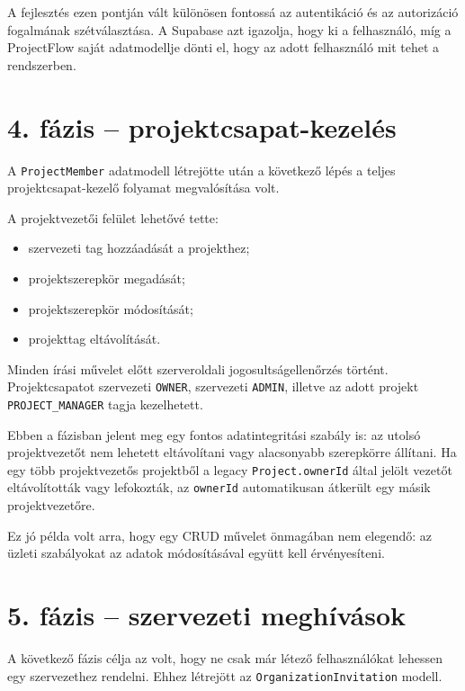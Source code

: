 \documentclass[11pt,a4paper]{report}
\begin{document}
    A fejlesztés ezen pontján vált különösen fontossá az autentikáció és az
    autorizáció fogalmának szétválasztása. A Supabase azt igazolja, hogy ki a
    felhasználó, míg a ProjectFlow saját adatmodellje dönti el, hogy az adott
    felhasználó mit tehet a rendszerben.

    \section{4. fázis -- projektcsapat-kezelés}

    A \texttt{ProjectMember} adatmodell létrejötte után a következő lépés a teljes
    projektcsapat-kezelő folyamat megvalósítása volt.

    A projektvezetői felület lehetővé tette:
    \begin{itemize}
        \item szervezeti tag hozzáadását a projekthez;
        \item projektszerepkör megadását;
        \item projektszerepkör módosítását;
        \item projekttag eltávolítását.
    \end{itemize}

    Minden írási művelet előtt szerveroldali jogosultságellenőrzés történt.
    Projektcsapatot szervezeti \texttt{OWNER}, szervezeti \texttt{ADMIN}, illetve
    az adott projekt \texttt{PROJECT\_MANAGER} tagja kezelhetett.

    Ebben a fázisban jelent meg egy fontos adatintegritási szabály is: az utolsó
    projektvezetőt nem lehetett eltávolítani vagy alacsonyabb szerepkörre
    állítani. Ha egy több projektvezetős projektből a legacy
    \texttt{Project.ownerId} által jelölt vezetőt eltávolították vagy
    lefokozták, az \texttt{ownerId} automatikusan átkerült egy másik
    projektvezetőre.

    Ez jó példa volt arra, hogy egy CRUD művelet önmagában nem elegendő: az
    üzleti szabályokat az adatok módosításával együtt kell érvényesíteni.

    \section{5. fázis -- szervezeti meghívások}

    A következő fázis célja az volt, hogy ne csak már létező felhasználókat lehessen
    egy szervezethez rendelni. Ehhez létrejött az
    \texttt{OrganizationInvitation} modell.
\end{document}

